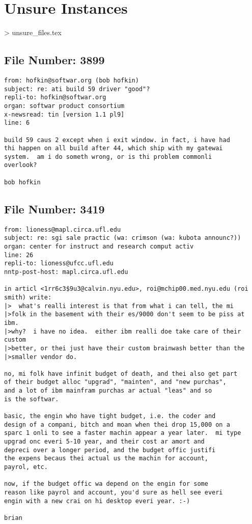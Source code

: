 \section{Unsure Instances} > unsure_files.tex
\subsection{File Number: 3899}
\begin{verbatim}
from: hofkin@softwar.org (bob hofkin)
subject: re: ati build 59 driver "good"?
repli-to: hofkin@softwar.org
organ: softwar product consortium
x-newsread: tin [version 1.1 pl9]
line: 6

build 59 caus 2 except when i exit window. in fact, i have had
thi happen on all build after 44, which ship with my gatewai
system.  am i do someth wrong, or is thi problem commonli
overlook?

bob hofkin
\end{verbatim}
\subsection{File Number: 3419}
\begin{verbatim}
from: lioness@mapl.circa.ufl.edu
subject: re: sgi sale practic (wa: crimson (wa: kubota announc?))
organ: center for instruct and research comput activ
line: 26
repli-to: lioness@ufcc.ufl.edu
nntp-post-host: mapl.circa.ufl.edu

in articl <1rr6c3$9u3@calvin.nyu.edu>, roi@mchip00.med.nyu.edu (roi smith) write:
|>	what's realli interest is that from what i can tell, the mi
|>folk in the basement with their es/9000 don't seem to be piss at ibm.
|>why?  i have no idea.  either ibm realli doe take care of their custom
|>better, or thei just have their custom brainwash better than the
|>smaller vendor do.

no, mi folk have infinit budget of death, and thei also get part
of their budget alloc "upgrad", "mainten", and "new purchas",
and a lot of ibm mainfram purchas ar actual "leas" and so
is the softwar.

basic, the engin who have tight budget, i.e. the coder and
design of a compani, bitch and moan when thei drop 15,000 on a 
sparc 1 onli to see a faster machin appear a year later.  mi type
upgrad onc everi 5-10 year, and their cost ar amort and
depreci over a longer period, and the budget offic justifi
the expens becaus thei actual us the machin for account,
payrol, etc.

now, if the budget offic wa depend on the engin for some
reason like payrol and account, you'd sure as hell see everi
engin with a new crai on hi desktop everi year. :-)

brian

\end{verbatim}
